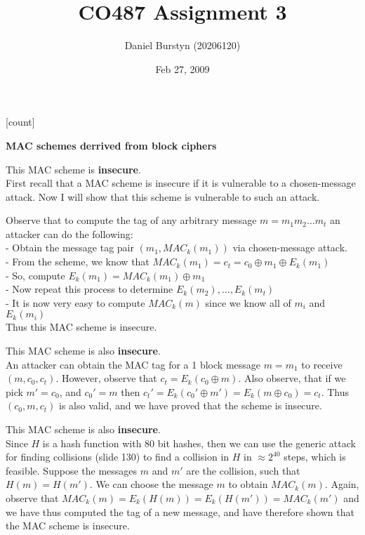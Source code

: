 \documentclass[12pt]{article}
\title{CO487 Assignment 3}
\author{Daniel Burstyn (20206120)}
\date{Feb 27, 2009}
\begin{document}
\maketitle
{}
[count]
\begin{list}{.}{}

\item \textbf{MAC schemes derrived from block ciphers}
\begin{list}{)}{}

\item This MAC scheme is \textbf{insecure}.\\
First recall that a MAC scheme is insecure if it is vulnerable to a
chosen-message attack.  Now I will show that this scheme is vulnerable to such
an attack.

Observe that to compute the tag of any arbitrary message $m = m_1m_2\dots m_t$
an attacker can do the following:\\
- Obtain the message tag pair $(m_1,MAC_k(m_1))$ via chosen-message attack.\\
- From the scheme, we know that $MAC_k(m_1) = c_t = c_0 \oplus m_1 \oplus
E_k(m_1)$\\
- So, compute $E_k(m_1) = MAC_k(m_1) \oplus m_1$\\
- Now repeat this process to determine $E_k(m_2), \dots, E_k(m_t)$\\
- It is now very easy to compute $MAC_k(m)$ since we know all of $m_i$ and
$E_k(m_i)$\\
Thus this MAC scheme is insecure.

\item This MAC scheme is also \textbf{insecure}.\\
An attacker can obtain the MAC tag for a 1 block message $m = m_1$ to receive
$(m, c_0, c_t)$.  However, observe that $c_t = E_k(c_0 \oplus m)$.  Also
observe, that if we pick $m' = c_0$, and $c_0' = m$ then $c_t' = E_k(c_0' \oplus
m') = E_k(m \oplus c_0) = c_t$.  Thus $(c_0, m, c_t)$ is also valid, and we have
proved that the scheme is insecure.

\item This MAC scheme is also \textbf{insecure}.\\
Since $H$ is a hash function with 80 bit hashes, then we can use the generic
attack for finding collisions (slide 130) to find a collision in $H$ in $\approx
2^{40}$ steps, which is feasible.  Suppose the messages $m$ and $m'$ are the
collision, such that $H(m) = H(m')$.  We can choose the message $m$ to obtain
$MAC_k(m)$.  Again, observe that $MAC_k(m) = E_k(H(m)) = E_k(H(m')) = MAC_k(m')$
and we have thus computed the tag of a new message, and have therefore shown
that the MAC scheme is insecure.


\end{list}
\end{list}
\end{document}
